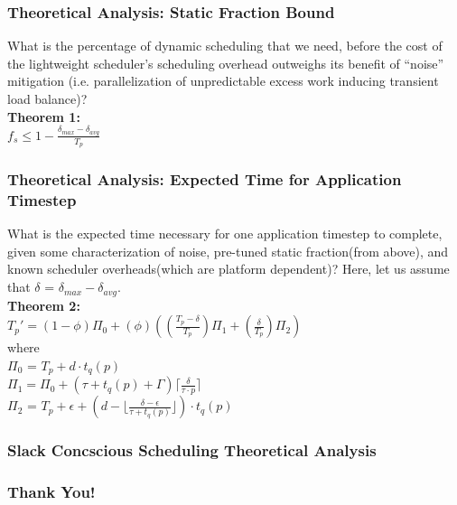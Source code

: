 \begin{frame}
\frametitle{Theoretical Analysis: Static Fraction Bound}

What is the percentage of dynamic scheduling that we need, before the
cost of the lightweight scheduler's scheduling overhead outweighs its
benefit of ``noise'' mitigation (i.e. parallelization of unpredictable
excess work inducing transient load balance)? \\

\textbf{Theorem 1:} \\
 $f_{s} \leq 1 - \frac{{\delta}_{max} -{\delta}_{avg}}{T_{p}}$ \\ 
\end{frame} 

\begin{frame}
\frametitle{Theoretical Analysis: Expected Time for Application Timestep}

What is the expected time necessary for one application timestep to
complete, given some characterization of noise, pre-tuned static
fraction(from above), and known scheduler overheads(which are platform
dependent)?  Here, let us assume that $\delta$ = $\delta_{max} -
\delta_{avg} $. \\

\textbf{Theorem 2:} \\ 
 $ T_{p}' = (1 - {\phi}){\Pi}_0 + (\phi)((\frac{T_p -\delta}{T_p}){\Pi}_1 + (\frac{\delta}{T_p}){\Pi}_2) $ \\ 

where \\  
${\Pi}_0$ = $T_p + d \cdot {t_q}(p)$ \\  
${\Pi}_1 = {\Pi}_0 + (\tau + {t_q}(p) + \Gamma) \lceil \frac{\delta}{\tau \cdot p} \rceil $ \\
${\Pi}_2$ =  $T_p + \epsilon + (d - \lfloor \frac{\delta - \epsilon}{\tau + {t_q}(p)} \rfloor) \cdot {t_q}(p)$ \\ 
\end{frame}  


\begin{frame}
\frametitle{Slack Concscious Scheduling Theoretical Analysis}

\end{frame}


\begin{frame} 
\frametitle{Thank You!} 
\end{frame}
